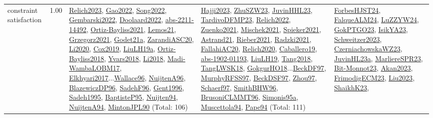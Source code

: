 {\begin{longtable}{p{3cm}r>{\raggedright\arraybackslash}p{6cm}>{\raggedright\arraybackslash}p{6cm}>{\raggedright\arraybackslash}p{8cm}}
\index{constraint satisfaction}\index{CP!constraint satisfaction}constraint satisfaction &  1.00 & \hyperref[detail:Relich2023]{Relich2023}, \hyperref[detail:Gao2022]{Gao2022}, \hyperref[detail:Song2022]{Song2022}, \hyperref[detail:Gembarski2022]{Gembarski2022}, \hyperref[detail:Doolaard2022]{Doolaard2022}, \hyperref[detail:abs-2211-14492]{abs-2211-14492}, \hyperref[detail:Ortiz-Bayliss2021]{Ortiz-Bayliss2021}, \hyperref[detail:Lemos21]{Lemos21}, \hyperref[detail:Grzegorz2021]{Grzegorz2021}, \hyperref[detail:Godet21a]{Godet21a}, \hyperref[detail:ZarandiASC20]{ZarandiASC20}, \hyperref[detail:Li2020]{Li2020}, \hyperref[detail:Cox2019]{Cox2019}, \hyperref[detail:LiuLH19a]{LiuLH19a}, \hyperref[detail:Ortiz-Bayliss2018]{Ortiz-Bayliss2018}, \hyperref[detail:Yvars2018]{Yvars2018}, \hyperref[detail:Li2018]{Li2018}, \hyperref[detail:Madi-WambaLOBM17]{Madi-WambaLOBM17}, \hyperref[detail:Elkhyari2017]{Elkhyari2017}...\hyperref[detail:Wallace96]{Wallace96}, \hyperref[detail:NuijtenA96]{NuijtenA96}, \hyperref[detail:BlazewiczDP96]{BlazewiczDP96}, \hyperref[detail:SadehF96]{SadehF96}, \hyperref[detail:Gent1996]{Gent1996}, \hyperref[detail:Sadeh1995]{Sadeh1995}, \hyperref[detail:BaptisteP95]{BaptisteP95}, \hyperref[detail:Nuijten94]{Nuijten94}, \hyperref[detail:NuijtenA94]{NuijtenA94}, \hyperref[detail:MintonJPL90]{MintonJPL90} (Total: 106) & \hyperref[detail:Hajji2023]{Hajji2023}, \hyperref[detail:ZhuSZW23]{ZhuSZW23}, \hyperref[detail:JuvinHHL23]{JuvinHHL23}, \hyperref[detail:TardivoDFMP23]{TardivoDFMP23}, \hyperref[detail:Relich2022]{Relich2022}, \hyperref[detail:Zuenko2021]{Zuenko2021}, \hyperref[detail:Mischek2021]{Mischek2021}, \hyperref[detail:Spieker2021]{Spieker2021}, \hyperref[detail:Astrand21]{Astrand21}, \hyperref[detail:Rieber2021]{Rieber2021}, \hyperref[detail:Radzki2021]{Radzki2021}, \hyperref[detail:FallahiAC20]{FallahiAC20}, \hyperref[detail:Relich2020]{Relich2020}, \hyperref[detail:Caballero19]{Caballero19}, \hyperref[detail:abs-1902-01193]{abs-1902-01193}, \hyperref[detail:LiuLH19]{LiuLH19}, \hyperref[detail:Tang2018]{Tang2018}, \hyperref[detail:TangLWSK18]{TangLWSK18}, \hyperref[detail:GokgurHO18]{GokgurHO18}...\hyperref[detail:BeckDF97]{BeckDF97}, \hyperref[detail:MurphyRFSS97]{MurphyRFSS97}, \hyperref[detail:BeckDSF97]{BeckDSF97}, \hyperref[detail:Zhou97]{Zhou97}, \hyperref[detail:Schaerf97]{Schaerf97}, \hyperref[detail:SmithBHW96]{SmithBHW96}, \hyperref[detail:BrusoniCLMMT96]{BrusoniCLMMT96}, \hyperref[detail:Simonis95a]{Simonis95a}, \hyperref[detail:Muscettola94]{Muscettola94}, \hyperref[detail:Pape94]{Pape94} (Total: 111) & \hyperref[detail:ForbesHJST24]{ForbesHJST24}, \hyperref[detail:FalqueALM24]{FalqueALM24}, \hyperref[detail:LuZZYW24]{LuZZYW24}, \hyperref[detail:GokPTGO23]{GokPTGO23}, \hyperref[detail:IsikYA23]{IsikYA23}, \hyperref[detail:Schweitzer2023]{Schweitzer2023}, \hyperref[detail:CzerniachowskaWZ23]{CzerniachowskaWZ23}, \hyperref[detail:JuvinHL23a]{JuvinHL23a}, \hyperref[detail:MarliereSPR23]{MarliereSPR23}, \hyperref[detail:Bit-Monnot23]{Bit-Monnot23}, \hyperref[detail:Akan2023]{Akan2023}, \hyperref[detail:FrimodigECM23]{FrimodigECM23}, \hyperref[detail:Liu2023]{Liu2023}, \hyperref[detail:ShaikhK23]{ShaikhK23}, 
\end{longtable}}
